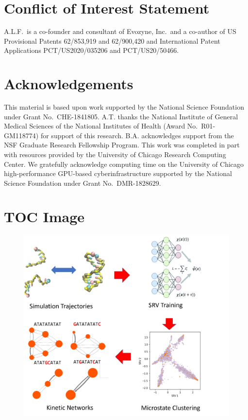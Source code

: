\documentclass[journal=jpcbfk,manuscript=article]{achemso}
\begin{document}
\section*{Conflict of Interest Statement}

A.L.F.\ is a co-founder and consultant of Evozyne, Inc.\ and a co-author of US Provisional Patents 62/853,919 and 62/900,420 and International Patent Applications PCT/US2020/035206 and PCT/US20/50466.


\section*{Acknowledgements}

This material is based upon work supported by the National Science Foundation under Grant No.\ CHE-1841805. A.T. thanks the National Institute of General Medical Sciences of the National Institutes of Health (Award No.\ R01-GM118774) for support of this research. B.A. acknowledges support from the NSF Graduate Research Fellowship Program. This work was completed in part with resources provided by the University of Chicago Research Computing Center. We gratefully acknowledge computing time on the University of Chicago high-performance GPU-based cyberinfrastructure supported by the National Science Foundation under Grant No.\ DMR-1828629.


\clearpage
\newpage

%




\clearpage
\newpage

\section*{TOC Image}

\begin{figure}[ht!]
	\begin{center} 
        \includegraphics[width=150mm, scale=1]{TOC.pdf}
        \label{fig:TOC}
	\end{center}
\end{figure}
\end{document}
